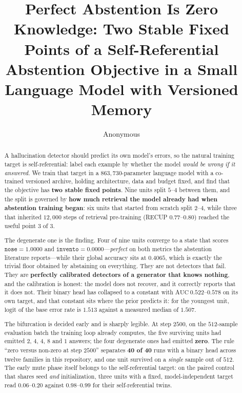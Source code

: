 \documentclass[11pt]{article}
\title{Perfect Abstention Is Zero Knowledge: Two Stable Fixed Points of a
Self-Referential Abstention Objective in a Small Language Model with Versioned Memory}
\author{Anonymous}
\begin{document}
\maketitle

\begin{abstract}
\noindent
A hallucination detector should predict its own model's errors, so the natural training target is
self-referential: label each example by whether the model \emph{would be wrong if it answered}. We
train that target in a $863{,}730$-parameter language model with a co-trained versioned archive,
holding architecture, data and budget fixed, and find that the objective has \textbf{two stable fixed
points}. Nine units split $5$--$4$ between them, and the split is governed by \textbf{how much
retrieval the model already had when abstention training began}: six units that started from scratch
split $2$--$4$, while three that inherited $12{,}000$ steps of retrieval pre-training (RECUP
$0.77$--$0.80$) reached the useful point $3$ of $3$.

The degenerate one is the finding. Four of nine units converge to a state that scores
$\texttt{nose} = 1.0000$ and $\texttt{invento} = 0.0000$---\emph{perfect} on both metrics the
abstention literature reports---while their global accuracy sits at $0.4065$, which is exactly the
trivial floor obtained by abstaining on everything. They are not detectors that fail. They are
\textbf{perfectly calibrated detectors of a generator that knows nothing}, and the calibration is
honest: the model does not recover, and it correctly reports that it does not. Their binary head has
collapsed to a constant with $\mathrm{AUC}\ 0.522$--$0.578$ on its own target, and that constant sits
where the prior predicts it: for the youngest unit, $\mathrm{logit}$ of the base error rate is
$1.513$ against a measured median of $1.507$.

The bifurcation is decided early and is sharply legible. At step $2500$, on the $512$-sample
evaluation batch the training loop already computes, the five surviving units had emitted
$2$, $4$, $4$, $8$ and $1$ answers; the four degenerate ones had emitted \textbf{zero}. The rule
``zero versus non-zero at step $2500$'' separates \textbf{40 of 40} runs with a binary head across
twelve families in this repository, and one unit survived on a \emph{single} sample out of $512$.
The early mute phase itself belongs to the self-referential target: on the paired control that
shares seed \emph{and} initialization, three units with a fixed, model-independent target read
$0.06$--$0.20$ against $0.98$--$0.99$ for their self-referential twins.


\end{abstract}
\end{document}
